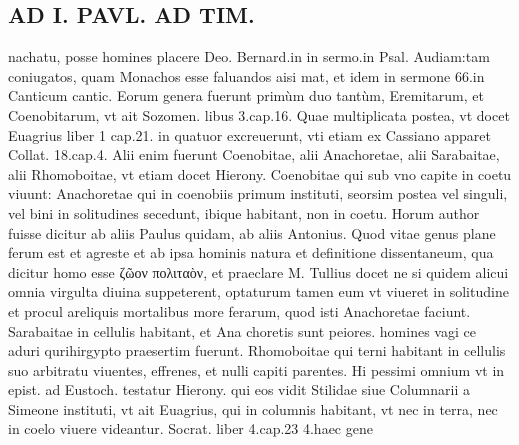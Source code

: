 \documentclass{article}
\begin{document}
\begin{pages}
\section*{AD I. PAVL. AD TIM. }
\marginpar{[ p.218 ]}\pstart nachatu, posse homines placere Deo. Bernard.in in sermo.in Psal. Audiam:tam coniugatos, quam Monachos esse faluandos aisi mat, et idem in sermone 66.in Canticum cantic.  \pend\pstart Eorum genera fuerunt primùm duo tantùm, Eremitarum, et Coenobitarum, vt ait Sozomen. libus 3.cap.16. Quae multiplicata postea, vt docet Euagrius liber 1 cap.21. in quatuor excreuerunt, vti etiam ex Cassiano apparet Collat. 18.cap.4. Alii enim fuerunt Coenobitae, alii Anachoretae, alii Sarabaitae, alii Rhomoboitae, vt etiam docet Hierony. Coenobitae qui sub vno capite in coetu viuunt: Anachoretae qui in coenobiis primum instituti, seorsim postea vel singuli, vel bini in solitudines secedunt, ibique habitant, non in coetu. Horum author fuisse dicitur ab aliis Paulus quidam, ab aliis Antonius. Quod vitae genus plane ferum est et agreste et ab ipsa hominis natura et definitione dissentaneum, qua dicitur homo esse ζῶον πολιταὸν, et praeclare M. Tullius docet ne si quidem alicui omnia virgulta diuina suppeterent, optaturum tamen eum vt viueret in solitudine et procul areliquis mortalibus more ferarum, quod isti Anachoretae faciunt. Sarabaitae in cellulis habitant, et Ana choretis sunt peiores. homines vagi ce aduri qurihirgypto praesertim fuerunt. Rhomoboitae qui terni habitant in cellulis suo arbitratu viuentes, effrenes, et nulli capiti parentes. Hi pessimi omnium vt in epist. ad Eustoch. testatur Hierony. qui eos vidit Stilidae siue Columnarii a Simeone instituti, vt ait Euagrius, qui in columnis habitant, vt nec in terra, nec in coelo viuere videantur. Socrat. liber 4.cap.23 4.haec gene\pend

\end{pages}
\end{document}

